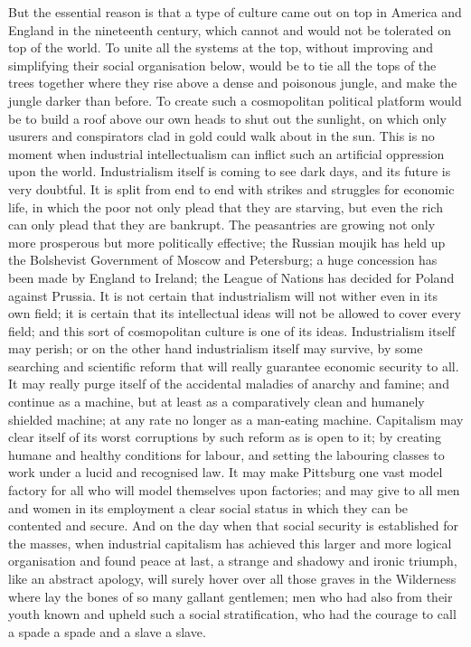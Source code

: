 \documentclass{book}
\begin{document}
But the essential reason is that a type of culture came out on top in America and England in the nineteenth century, which cannot and would not be tolerated on top of the world. To unite all the systems at the top, without improving and simplifying their social organisation below, would be to tie all the tops of the trees together where they rise above a dense and poisonous jungle, and make the jungle darker than before. To create such a cosmopolitan political platform would be to build a roof above our own heads to shut out the sunlight, on which only usurers and conspirators clad in gold could walk about in the sun. This is no moment when industrial intellectualism can inflict such an artificial oppression upon the world. Industrialism itself is coming to see dark days, and its future is very doubtful. It is split from end to end with strikes and struggles for economic life, in which the poor not only plead that they are starving, but even the rich can only plead that they are bankrupt. The peasantries are growing not only more prosperous but more politically effective; the Russian moujik has held up the Bolshevist Government of Moscow and Petersburg; a huge concession has been made by England to Ireland; the League of Nations has decided for Poland against Prussia. It is not certain that industrialism will not wither even in its own field; it is certain that its intellectual ideas will not be allowed to cover every field; and this sort of cosmopolitan culture is one of its ideas. Industrialism itself may perish; or on the other hand industrialism itself may survive, by some searching and scientific reform that will really guarantee economic security to all. It may really purge itself of the accidental maladies of anarchy and famine; and continue as a machine, but at least as a comparatively clean and humanely shielded machine; at any rate no longer as a man-eating machine. Capitalism may clear itself of its worst corruptions by such reform as is open to it; by creating humane and healthy conditions for labour, and setting the labouring classes to work under a lucid and recognised law. It may make Pittsburg one vast model factory for all who will model themselves upon factories; and may give to all men and women in its employment a clear social status in which they can be contented and secure. And on the day when that social security is established for the masses, when industrial capitalism has achieved this larger and more logical organisation and found peace at last, a strange and shadowy and ironic triumph, like an abstract apology, will surely hover over all those graves in the Wilderness where lay the bones of so many gallant gentlemen; men who had also from their youth known and upheld such a social stratification, who had the courage to call a spade a spade and a slave a slave.
\end{document}
